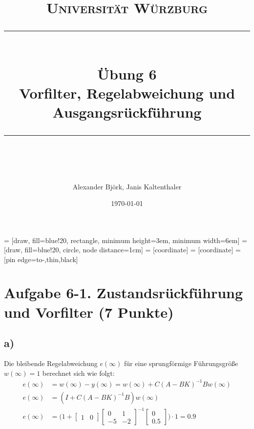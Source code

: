 \documentclass[11pt]{scrartcl} %
\title{	
	\normalfont\normalsize
	\textsc{Universität Würzburg}\\ %
	\vspace{25pt} %
	\rule{\linewidth}{0.5pt}\\ %
	\vspace{20pt} %
	{\huge Übung 6}\\ %
	{\Large Vorfilter, Regelabweichung und Ausgangsrückführung}\\
	\vspace{12pt} %
	\rule{\linewidth}{2pt}\\ %
	\vspace{12pt} %
}
\author{\LARGE Alexander Björk, Janis Kaltenthaler} %
\date{\normalsize\today} %
\begin{document}
\maketitle %

 = [draw, fill=blue!20, rectangle, 
    minimum height=3em, minimum width=6em]
 = [draw, fill=blue!20, circle, node distance=1cm]
 = [coordinate]
 = [coordinate]
 = [pin edge={to-,thin,black}]
\newcommand{\inte}{$\displaystyle \int$}

\section*{Aufgabe 6-1. Zustandsrückführung und Vorfilter (7 Punkte)}
\subsection*{a)}
Die bleibende Regelabweichung $e(\infty)$ für eine sprungförmige Führungsgröße $w(\infty)=1$ berechnet sich wie folgt:
\begin{align*}
	e(\infty)&=w(\infty)-y(\infty)=w(\infty)+C(A-BK)^{-1}Bw(\infty)\\
	e(\infty)&=(I+C(A-BK)^{-1}B)w(\infty)\\
	e(\infty)&=\Biggl(1+\begin{bmatrix}1&0\end{bmatrix}\begin{bmatrix}0&1\\-5&-2\end{bmatrix}^{-1}\begin{bmatrix}0\\0.5\end{bmatrix}\Biggr)\cdot 1=0.9
\end{align*}
\end{document}
